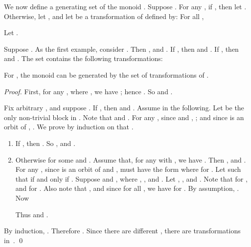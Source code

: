 \documentclass{llncs}
\newcommand{\be}{\begin{enumerate}}
\newcommand{\ee}{\end{enumerate}}
\newcommand{\qedb}{\hfill}
\begin{document}
We now define a generating set of the monoid . 
Suppose . For any , if , then let . Otherwise, let , and let  be a transformation of  defined by: For all , 

Let . 




\begin{example}\label{ex:genJT}
Suppose . As the first example, consider . Then , and . If , then  and . If , then  and . The set  contains the following  transformations: 
 
\qedb
\end{example}


\begin{proposition}\label{prop:genJT}
For , the monoid  can be generated by the set  of  transformations of . 
\end{proposition}


\begin{proof}
First, for any , where , we have ; hence . So  and . 

Fix arbitrary , and suppose . If , then  and . Assume  in the following. Let  be the only non-trivial block in . Note that  and . For any , since  and , ; and since  is an orbit of , . We prove by induction on  that . 
\be
\item If , then . So , and . 

\item Otherwise  for some  and . Assume that, for any  with , we have . Then , and . For any , since  is an orbit of  and ,  must have the form  where  for . 
Let  such that  if and only if . Suppose  and , where , ,  and . Let , , and . Note that  for , and  for . Also note that , and since  for all , we have  for . By assumption, . Now

Thus  and . 
\ee
By induction, . Therefore . Since there are  different , there are  transformations in~. \qed
\end{proof}
\end{document}
